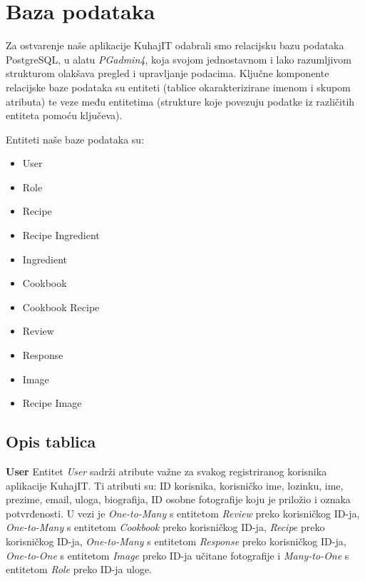 		\section{Baza podataka}

		Za ostvarenje naše aplikacije KuhajIT odabrali smo relacijsku bazu podataka PostgreSQL, u alatu \textit{PGadmin4}, koja svojom jednostavnom i lako razumljivom strukturom olakšava pregled i upravljanje podacima. Ključne komponente relacijske baze podataka su entiteti (tablice okarakterizirane imenom i skupom atributa) te veze među entitetima (strukture koje povezuju podatke iz različitih entiteta pomoću ključeva).
		
		Entiteti naše baze podataka su:
		\begin{itemize}
			\item User
			\item Role
			\item Recipe
			\item Recipe Ingredient
			\item Ingredient
			\item Cookbook
			\item Cookbook Recipe
			\item Review
			\item Response
			\item Image
			\item Recipe Image
		\end{itemize}
		
		
			\subsection{Opis tablica}
				
				\textbf{User} Entitet \textit{User} sadrži atribute važne za svakog registriranog korisnika aplikacije KuhajIT. Ti atributi su: ID korisnika, korisničko ime, lozinku, ime, prezime, email, uloga, biografija, ID osobne fotografije koju je priložio i oznaka potvrđenosti. U vezi je \textit{One-to-Many} s entitetom \textit{Review} preko korisničkog ID-ja, \textit{One-to-Many} s entitetom \textit{Cookbook} preko korisničkog ID-ja, \textit{Recipe} preko korisničkog ID-ja, \textit{One-to-Many} s entitetom \textit{Response} preko korisničkog ID-ja, \textit{One-to-One} s entitetom \textit{Image} preko ID-ja učitane fotografije i \textit{Many-to-One} s entitetom \textit{Role} preko ID-ja uloge.
				
